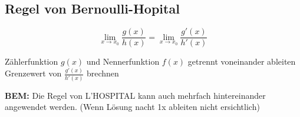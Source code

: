 \begin{multicols*}{3}
    \subsection{Regel von Bernoulli-Hopital}


    $$ \lim_{x \to x_0} \frac{g(x)}{h(x)} = \lim_{x \to x_0} \frac{g'(x)}{h'(x)}$$

    { Zählerfunktion $g(x)$ und Nennerfunktion $f(x)$ getrennt voneinander ableiten}
    \WhiteSpace
    { Grenzewert von $\frac{g'(x)}{h'(x)}$ brechnen}
    \WhiteSpace

    {\textbf{BEM:} Die Regel von L'HOSPITAL kann auch mehrfach hintereinander angewendet werden.}
    {\small(Wenn Lösung nacht 1x ableiten nicht ersichtlich)}
    \mbox{}

\end{multicols*}


